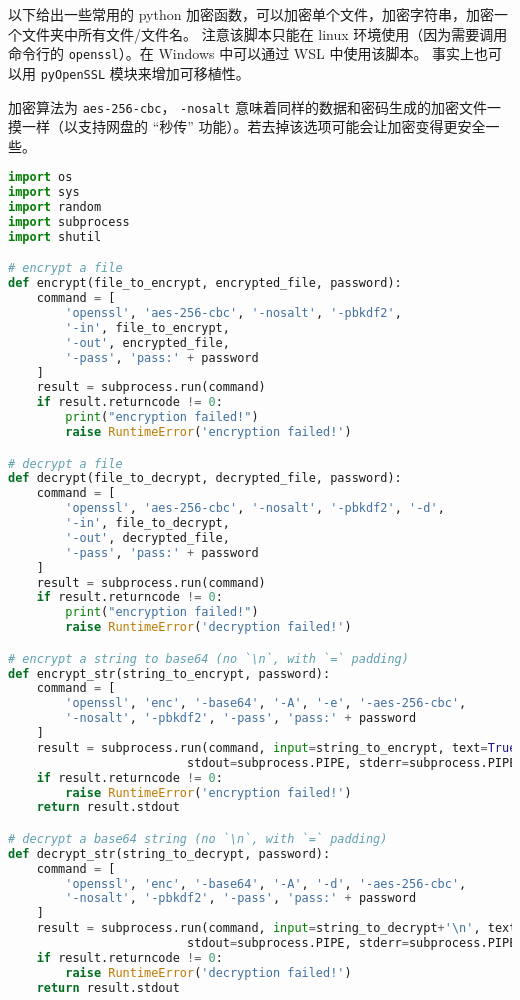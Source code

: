 

以下给出一些常用的 python 加密函数，可以加密单个文件，加密字符串，加密一个文件夹中所有文件/文件名。 注意该脚本只能在 linux 环境使用（因为需要调用命令行的 \verb`openssl`）。在 Windows 中可以通过 WSL 中使用该脚本。 事实上也可以用 \verb|pyOpenSSL| 模块来增加可移植性。

加密算法为 \verb`aes-256-cbc`， \verb`-nosalt` 意味着同样的数据和密码生成的加密文件一摸一样（以支持网盘的 “秒传” 功能）。若去掉该选项可能会让加密变得更安全一些。

\begin{lstlisting}[language=python,caption=encrypt.py]
import os
import sys
import random
import subprocess
import shutil

# encrypt a file
def encrypt(file_to_encrypt, encrypted_file, password):
	command = [
		'openssl', 'aes-256-cbc', '-nosalt', '-pbkdf2',
		'-in', file_to_encrypt,
		'-out', encrypted_file,
		'-pass', 'pass:' + password
	]
	result = subprocess.run(command)
	if result.returncode != 0:
		print("encryption failed!")
		raise RuntimeError('encryption failed!')

# decrypt a file
def decrypt(file_to_decrypt, decrypted_file, password):
	command = [
		'openssl', 'aes-256-cbc', '-nosalt', '-pbkdf2', '-d',
		'-in', file_to_decrypt,
		'-out', decrypted_file,
		'-pass', 'pass:' + password
	]
	result = subprocess.run(command)
	if result.returncode != 0:
		print("encryption failed!")
		raise RuntimeError('decryption failed!')

# encrypt a string to base64 (no `\n`, with `=` padding)
def encrypt_str(string_to_encrypt, password):
	command = [
		'openssl', 'enc', '-base64', '-A', '-e', '-aes-256-cbc',
		'-nosalt', '-pbkdf2', '-pass', 'pass:' + password
	]
	result = subprocess.run(command, input=string_to_encrypt, text=True,
						 stdout=subprocess.PIPE, stderr=subprocess.PIPE)
	if result.returncode != 0:
		raise RuntimeError('encryption failed!')
	return result.stdout

# decrypt a base64 string (no `\n`, with `=` padding)
def decrypt_str(string_to_decrypt, password):
	command = [
		'openssl', 'enc', '-base64', '-A', '-d', '-aes-256-cbc',
		'-nosalt', '-pbkdf2', '-pass', 'pass:' + password
	]
	result = subprocess.run(command, input=string_to_decrypt+'\n', text=True,
						 stdout=subprocess.PIPE, stderr=subprocess.PIPE)
	if result.returncode != 0:
		raise RuntimeError('decryption failed!')
	return result.stdout


\end{lstlisting}
